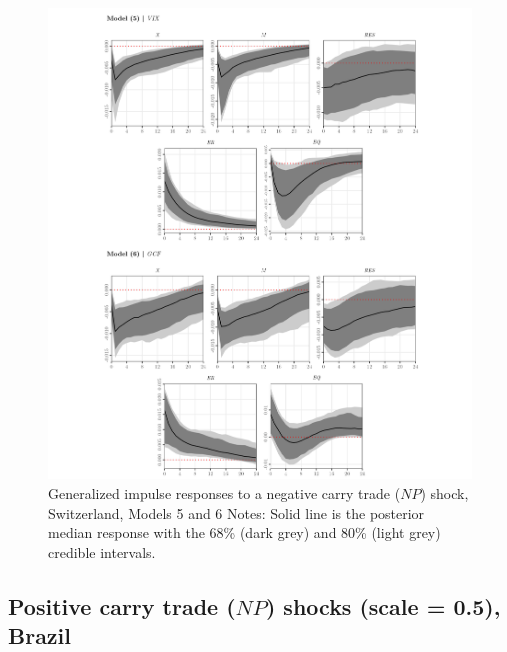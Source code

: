 \documentclass[a4paper, twoside]{templates/ociamthesis}
\begin{document}
\begin{figure}[!ht]

{\centering \includegraphics[width=0.99\columnwidth]{figure/g.MODEL56.NPLOWER.FUND.CH} 

}

\caption[Generalized impulse responses to a negative carry trade ($NP$) shock, Switzerland, Models 5 and 6]{Generalized impulse responses to a negative carry trade ($NP$) shock, Switzerland, Models 5 and 6 \newline \scriptsize Notes: Solid line is the posterior median response with the 68\% (dark grey) and 80\% (light grey) credible intervals.}\label{fig:Figure53}
\end{figure}

\clearpage

\hypertarget{appendixdNPBR}{%
\subsection{\texorpdfstring{Positive carry trade (\(NP\)) shocks (scale = 0.5), Brazil}{Positive carry trade (NP) shocks (scale = 0.5), Brazil}}\label{appendixdNPBR}}
\end{document}
